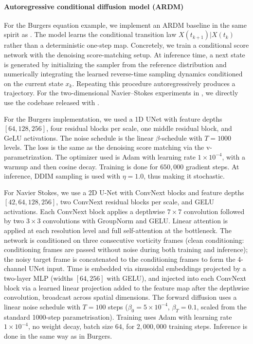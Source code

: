 \documentclass[oneside,11pt]{article}
\theoremstyle{remark}
\begin{document}
\paragraph{Autoregressive conditional diffusion model (ARDM)} For the Burgers equation example, we implement an ARDM baseline in the same spirit as \cite{KOHL2026108641}. The model learns the conditional transition law $X(t_{k + 1}) | X(t_k)$ rather than a deterministic one-step map.  Concretely, we train a conditional score network with the denoising score-matching setup.  At inference time, a next state is generated by initializing the sampler from the reference distribution and numerically integrating the learned reverse-time sampling dynamics conditioned on the current state $x_k$.  Repeating this procedure autoregressively produces a trajectory. For the two-dimensional Navier--Stokes experiments in , we directly use the codebase released with \cite{KOHL2026108641}.  

For the Burgers implementation, we used a 1D UNet with feature depths $[64, 128, 256]$, four residual blocks per scale, one middle residual block, and GeLU activations. The noise schedule is the linear $\beta$-schedule with $T = 1000$ levels. The loss is the same as the denoising score matching via the v-parametrization. The optimizer used is Adam with learning rate $1 \times 10^{-4}$, with a warmup and then cosine decay. Training is done for $650,000$ gradient steps. At inference, DDIM sampling is used with $\eta = 1.0$, thus making it stochastic. 

For Navier Stokes, we use a 2D U-Net with ConvNext blocks and feature depths $[42, 64, 128, 256]$, two ConvNext residual blocks per scale, and GELU activations. Each ConvNext block applies a depthwise $7{\times}7$ convolution followed by two  $3{\times}3$ convolutions with GroupNorm and GELU. Linear attention is applied at each resolution level and full self-attention at the bottleneck. The network is conditioned on three consecutive vorticity frames (clean conditioning: conditioning frames are passed without noise during both training and inference); the noisy target frame is concatenated to the conditioning frames to form the 4-channel UNet input. Time is embedded via sinusoidal embeddings projected by a two-layer MLP (widths $[64, 256]$ with GELU), and injected into each ConvNext block via a learned linear projection added to the feature map after the depthwise convolution, broadcast across spatial dimensions. The forward diffusion uses a linear noise schedule with $T{=}100$ steps ($\beta_0{=}5{\times}10^{-4}$, $\beta_T{=}0.1$, scaled from the standard 1000-step parametrisation). Training uses Adam with learning rate $1{\times}10^{-4}$, no weight decay, batch size $64$, for $2,000,000$ training steps. Inference is done in the same way as in Burgers. 
\end{document}
